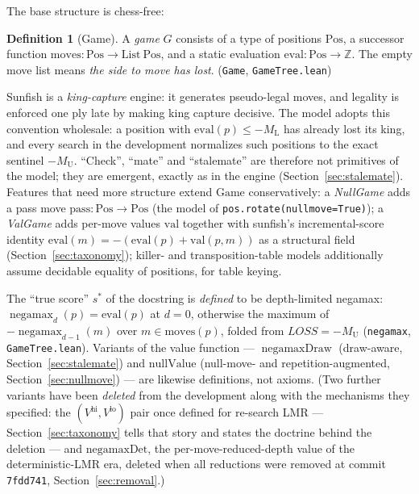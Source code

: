\documentclass[11pt]{article}
\DeclareMathOperator{\negamax}{negamax}
\DeclareMathOperator{\negamaxD}{negamaxDraw}
\newcommand{\MU}{M_{\mathrm{U}}}    %
\newcommand{\ML}{M_{\mathrm{L}}}    %
\newcommand{\LOSS}{\mathit{LOSS}}   %
\newcommand{\Vhi}{V^{\mathrm{hi}}}
\newcommand{\Vlo}{V^{\mathrm{lo}}}
\newcommand{\leanref}[2]{(\texttt{#1}, \texttt{#2})}%
\theoremstyle{plain}
\theoremstyle{definition}
\newtheorem{definition}[theorem]{Definition}
\theoremstyle{remark}
\begin{document}
The base structure is chess-free:

\begin{definition}[Game]
\label{def:game}
A \emph{game} $G$ consists of a type of positions $\mathrm{Pos}$, a
successor function $\mathrm{moves} : \mathrm{Pos} \to
\mathrm{List\ Pos}$, and a static evaluation $\mathrm{eval} :
\mathrm{Pos} \to \mathbb{Z}$.  The empty move list means \emph{the side
to move has lost}.  \leanref{Game}{GameTree.lean}
\end{definition}

Sunfish is a \emph{king-capture} engine: it generates pseudo-legal
moves, and legality is enforced one ply late by making king capture
decisive.  The model adopts this convention wholesale: a position with
$\mathrm{eval}(p) \le -\ML$ has already lost its king, and every search
in the development normalizes such positions to the exact sentinel
$-\MU$.  ``Check'', ``mate'' and ``stalemate'' are therefore not
primitives of the model; they are emergent, exactly as in the engine
(Section~\ref{sec:stalemate}).  Features that need more structure extend
$\mathrm{Game}$ conservatively: a \emph{NullGame} adds a pass move
$\mathrm{pass} : \mathrm{Pos} \to \mathrm{Pos}$ (the model of
\texttt{pos.rotate(nullmove=True)}); a \emph{ValGame} adds per-move
values $\mathrm{val}$ together with sunfish's incremental-score identity
$\mathrm{eval}(m) = -(\mathrm{eval}(p) + \mathrm{val}(p,m))$ as a
structural field (Section~\ref{sec:taxonomy}); killer- and
transposition-table models additionally assume decidable equality of
positions, for table keying.

The ``true score'' $s^*$ of the docstring is \emph{defined} to be
depth-limited negamax: $\negamax_d(p) = \mathrm{eval}(p)$ at $d = 0$,
otherwise the maximum of $-\negamax_{d-1}(m)$ over
$m \in \mathrm{moves}(p)$, folded from $\LOSS = -\MU$
\leanref{negamax}{GameTree.lean}.  Variants of the value function ---
$\negamaxD$ (draw-aware, Section~\ref{sec:stalemate}) and
$\mathrm{nullValue}$ (null-move- and
repetition-augmented, Section~\ref{sec:nullmove}) --- are likewise
definitions, not axioms.  (Two further variants have been
\emph{deleted} from the development along with the mechanisms they
specified: the $(\Vhi, \Vlo)$ pair once defined for re-search LMR ---
Section~\ref{sec:taxonomy} tells that story and states the doctrine
behind the deletion --- and $\mathrm{negamaxDet}$, the
per-move-reduced-depth value of the deterministic-LMR era, deleted
when all reductions were removed at commit \texttt{7fdd741},
Section~\ref{sec:removal}.)
\end{document}
